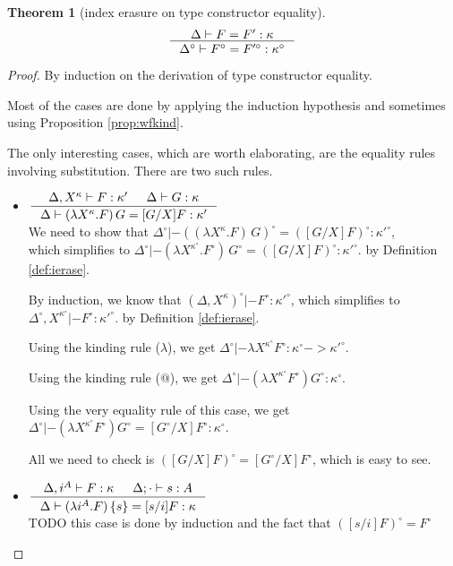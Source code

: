 \documentclass[preprint]{sigplanconf}
\theoremstyle{plain}
\newtheorem{theorem}{Theorem}
\theoremstyle{remark}
\theoremstyle{definition}
\begin{document}
\begin{theorem}[index erasure on type constructor equality]
\[ \inference{\Delta |- F=F':\kappa}
		{\Delta^\circ |- F^\circ=F'^\circ:\kappa^\circ}
\]
\end{theorem}
\begin{proof}
By induction on the derivation of type constructor equality.

Most of the cases are done by applying the induction hypothesis
and sometimes using Proposition \ref{prop:wfkind}.

The only interesting cases, which are worth elaborating, are
the equality rules involving substitution.
There are two such rules.

\begin{itemize}
\item
  $\inference{\Delta,X^\kappa |- F:\kappa' & \Delta |- G:\kappa}
             {\Delta |- (\lambda X^\kappa.F)\,G = [G/X]F:\kappa'}$ \\

We need to show that
$ \Delta^\circ |- ((\lambda X^\kappa.F)\,G)^\circ = ([G/X]F)^\circ : \kappa'^\circ $,\\
which simplifies to 
$ \Delta^\circ |- (\lambda X^{\kappa^\circ}.F^\circ)\,G^\circ = ([G/X]F)^\circ : \kappa'^\circ $.
	by Definition \ref{def:ierase}.

By induction, we know that $(\Delta,X^\kappa)^\circ |- F^\circ : \kappa'^\circ$,
which simplifies to $\Delta^\circ,X^{\kappa^\circ} |- F^\circ : \kappa'^\circ$.
	by Definition \ref{def:ierase}.

Using the kinding rule ($\lambda$), we get
$\Delta^\circ |- \lambda X^{\kappa^\circ} F^\circ : \kappa^\circ -> \kappa'^\circ$.

Using the kinding rule ($@$), we get
$\Delta^\circ |- (\lambda X^{\kappa^\circ} F^\circ) G^\circ : \kappa^\circ$.

Using the very equality rule of this case, we get 
$\Delta^\circ |- (\lambda X^{\kappa^\circ} F^\circ) G^\circ = [G^\circ/X] F^\circ : \kappa^\circ$.

All we need to check is $([G/X]F)^\circ = [G^\circ/X] F^\circ$,
which is easy to see.


\item
  $\inference{\Delta,i^A |- F:\kappa & \Delta;\cdot |- s:A}
             {\Delta |- (\lambda i^A.F)\,\{s\} = [s/i]F:\kappa}$ \\

TODO this case is done by induction and the fact that $([s/i]F)^\circ = F^\circ$
\end{itemize}
\end{proof}
\end{document}
